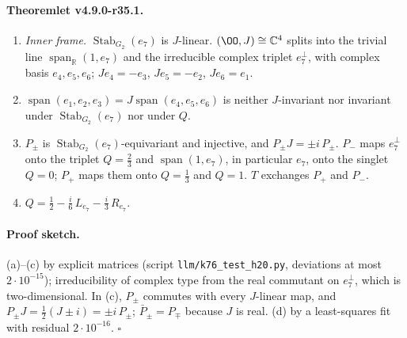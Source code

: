 \paragraph{Theoremlet v4.9.0-r35.1.}
\begin{enumerate}[leftmargin=2em]
\item[(a)] \emph{Inner frame.}  \(\operatorname{Stab}_{G_2}(e_7)\) is \(J\)-linear.  \((\OO,J)\cong\mathbb C^4\) splits into the trivial
line \(\operatorname{span}_{\mathbb R}(1,e_7)\) and the irreducible complex triplet \(e_7^\perp\), with complex basis \(e_4,e_5,e_6\);
\(Je_4=-e_3\), \(Je_5=-e_2\), \(Je_6=e_1\).
\item[(b)] \(\operatorname{span}(e_1,e_2,e_3)=J\operatorname{span}(e_4,e_5,e_6)\) is neither \(J\)-invariant nor invariant under
\(\operatorname{Stab}_{G_2}(e_7)\) nor under \(Q\).
\item[(c)] \(P_\pm\) is \(\operatorname{Stab}_{G_2}(e_7)\)-equivariant and injective, and \(P_\pm J=\pm i\,P_\pm\).  \(P_-\) maps
\(e_7^\perp\) onto the triplet \(Q=\tfrac23\) and \(\operatorname{span}(1,e_7)\), in particular \(e_7\), onto the singlet \(Q=0\);
\(P_+\) maps them onto \(Q=\tfrac13\) and \(Q=1\).  \(T\) exchanges \(P_+\) and \(P_-\).
\item[(d)] \(Q=\tfrac12-\tfrac{i}{6}\,L_{e_7}-\tfrac{i}{3}\,R_{e_7}\).
\end{enumerate}

\paragraph{Proof sketch.}
(a)--(c) by explicit matrices (script \texttt{llm/k76\_test\_h20.py}, deviations at most \(2\cdot10^{-15}\)); irreducibility of complex
type from the real commutant on \(e_7^\perp\), which is two-dimensional.  In (c), \(P_\pm\) commutes with every \(J\)-linear map, and
\(P_\pm J=\tfrac12(J\pm i)=\pm i\,P_\pm\); \(\bar P_\pm=P_\mp\) because \(J\) is real.  (d) by a least-squares fit with residual
\(2\cdot10^{-16}\).  \(\square\)

